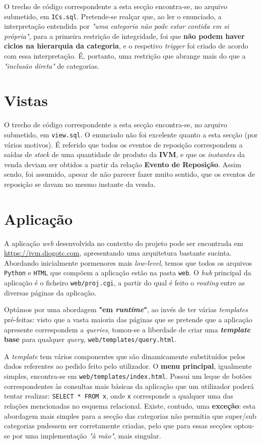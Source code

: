 \documentclass[12pt,a4paper]{article}
\begin{document}
  O trecho de código correspondente a esta secção encontra-se, no arquivo submetido,
  em \texttt{ICs.sql}. Pretende-se realçar que, ao ler o enunciado, a interpretação
  entendida por \textit{"uma categoria não pode estar contida em si própria"}, para
  a primeira restrição de integridade, foi que \textbf{não podem haver ciclos na
  hierarquia da categoria}, e o respetivo \textit{trigger} foi criado de acordo
  com essa interpretação. É, portanto, uma restrição que abrange mais do que
  a \textit{"inclusão direta"} de categorias.

  \section*{Vistas}

  O trecho de código correspondente a esta secção encontra-se, no arquivo submetido,
  em \texttt{view.sql}. O enunciado não foi excelente quanto a esta secção (por vários motivos).
  É referido que todos os eventos de reposição correspondem a saídas de \textit{stock} de uma
  quantidade de produto da \textbf{IVM}, e que os \textit{instantes} da venda
  deviam ser obtidos a partir da relação \textbf{Evento de Reposição}. Assim sendo,
  foi assumido, apesar de não parecer fazer muito sentido, que os eventos de reposição
  se davam no mesmo instante da venda.

  \section*{Aplicação}

  A aplicação \textit{web} desenvolvida no contexto do projeto pode ser encontrada
  em \url{https://ivm.diogotc.com}, apresentando uma arquitetura bastante sucinta.
  Abordando inicialmente pormenores mais \textit{low-level}, temos que todos os arquivos
  \texttt{Python} e \texttt{HTML} que compõem a aplicação estão na pasta \texttt{web}.
  O \textit{hub} principal da aplicação é o ficheiro \texttt{web/proj.cgi}, a partir do qual
  é feito o \textit{routing} entre as diversas páginas da aplicação.

  Optámos por uma abordagem \textbf{"em \textit{runtime}"}, ao invés de ter várias \textit{templates}
  pré-feitas: visto que a vasta maioria das páginas que se pretende que a aplicação
  apresente correspondem a \textit{queries}, tomou-se a liberdade de criar uma
  \textbf{\textit{template} base} para qualquer \textit{query}, \texttt{web/templates/query.html}.
  
  A \textit{template} tem vários componentes que são dinamicamente substituídos
  pelos dados referentes ao pedido feito pelo utilizador. O \textbf{menu principal},
  igualmente simples, encontra-se em \texttt{web/templates/index.html}. Possui um
  leque de botões correspondentes às consultas mais básicas da aplicação que um
  utilizador poderá tentar realizar: \texttt{SELECT * FROM x}, onde \texttt{x} corresponde a qualquer
  uma das relações mencionadas no esquema relacional. Existe, contudo, uma \textbf{exceção}:
  esta abordagem mais simples para a secção das categorias não permitia que
  super/sub categorias pudessem ser corretamente criadas, pelo que para essas secções
  optou-se por uma implementação \textit{"à mão"}, mais singular.
  
\end{document}
